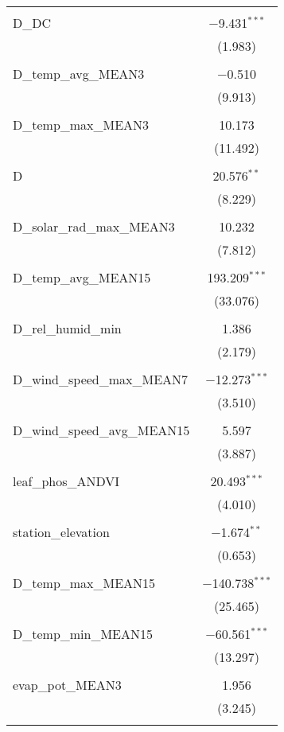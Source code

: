 \begin{table}[!htbp]
\begin{tabular}{@{\extracolsep{5pt}}lc}
  & \\ 
 D\_DC & $-$9.431$^{***}$ \\ 
  & (1.983) \\ 
  & \\ 
 D\_temp\_avg\_MEAN3 & $-$0.510 \\ 
  & (9.913) \\ 
  & \\ 
 D\_temp\_max\_MEAN3 & 10.173 \\ 
  & (11.492) \\ 
  & \\ 
 D & 20.576$^{**}$ \\ 
  & (8.229) \\ 
  & \\ 
 D\_solar\_rad\_max\_MEAN3 & 10.232 \\ 
  & (7.812) \\ 
  & \\ 
 D\_temp\_avg\_MEAN15 & 193.209$^{***}$ \\ 
  & (33.076) \\ 
  & \\ 
 D\_rel\_humid\_min & 1.386 \\ 
  & (2.179) \\ 
  & \\ 
 D\_wind\_speed\_max\_MEAN7 & $-$12.273$^{***}$ \\ 
  & (3.510) \\ 
  & \\ 
 D\_wind\_speed\_avg\_MEAN15 & 5.597 \\ 
  & (3.887) \\ 
  & \\ 
 leaf\_phos\_ANDVI & 20.493$^{***}$ \\ 
  & (4.010) \\ 
  & \\ 
 station\_elevation & $-$1.674$^{**}$ \\ 
  & (0.653) \\ 
  & \\ 
 D\_temp\_max\_MEAN15 & $-$140.738$^{***}$ \\ 
  & (25.465) \\ 
  & \\ 
 D\_temp\_min\_MEAN15 & $-$60.561$^{***}$ \\ 
  & (13.297) \\ 
  & \\ 
 evap\_pot\_MEAN3 & 1.956 \\ 
  & (3.245) \\ 
  & \\ 

\end{tabular}
\end{table}
